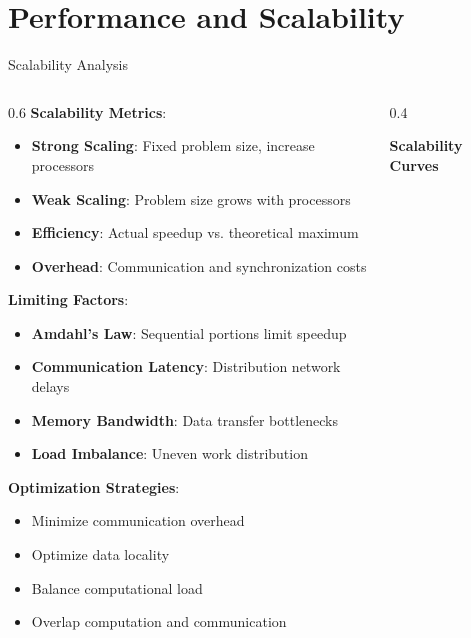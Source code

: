 \documentclass[aspectratio=169]{beamer}
\newcommand{\concept}[1]{\textbf{\color{darkblue}#1}}
\begin{document}
\section{Performance and Scalability}

\begin{frame}{Scalability Analysis}
\begin{columns}
\begin{column}{0.6\textwidth}
\concept{Scalability Metrics}:
\begin{itemize}
\item \textbf{Strong Scaling}: Fixed problem size, increase processors
\item \textbf{Weak Scaling}: Problem size grows with processors
\item \textbf{Efficiency}: Actual speedup vs. theoretical maximum
\item \textbf{Overhead}: Communication and synchronization costs
\end{itemize}

\vspace{0.3cm}
\concept{Limiting Factors}:
\begin{itemize}
\item \textbf{Amdahl's Law}: Sequential portions limit speedup
\item \textbf{Communication Latency}: Distribution network delays
\item \textbf{Memory Bandwidth}: Data transfer bottlenecks
\item \textbf{Load Imbalance}: Uneven work distribution
\end{itemize}

\vspace{0.3cm}
\concept{Optimization Strategies}:
\begin{itemize}
\item Minimize communication overhead
\item Optimize data locality
\item Balance computational load
\item Overlap computation and communication
\end{itemize}
\end{column}
\begin{column}{0.4\textwidth}
\begin{center}
\textbf{Scalability Curves}
\vspace{0.3cm}

\end{center}
\end{column}
\end{columns}
\end{frame}
\end{document}
